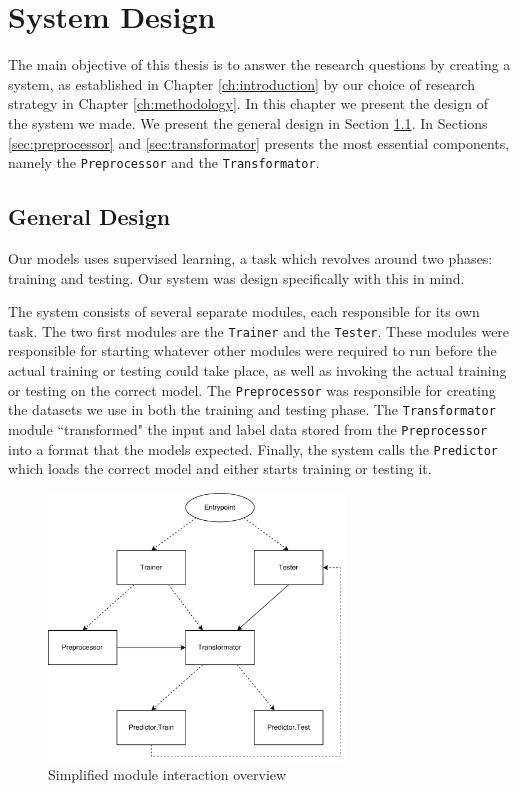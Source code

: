 
\chapter{System Design}
\label{ch:system_design}
The main objective of this thesis is to answer the research questions by creating a system, as established in Chapter \ref{ch:introduction} by our choice of research strategy in Chapter \ref{ch:methodology}. In this chapter we present the design of the system we made. We present the general design in Section \ref{sec:general_design}. In Sections \ref{sec:preprocessor} and \ref{sec:transformator} presents the most essential components, namely the {\tt Preprocessor} and the {\tt Transformator}.


\section{General Design}
\label{sec:general_design}
Our models uses supervised learning, a task which revolves around two phases: training and testing. Our system was design specifically with this in mind.

The system consists of several separate modules, each responsible for its own task. The two first modules are the {\tt Trainer} and the {\tt Tester}. These modules were responsible for starting whatever other modules were required to run before the actual training or testing could take place, as well as invoking the actual training or testing on the correct model. The {\tt Preprocessor} was responsible for creating the datasets we use in both the training and testing phase. The {\tt Transformator} module ``transformed" the input and label data stored from the {\tt Preprocessor} into a format that the models expected. Finally, the system calls the {\tt Predictor} which loads the correct model and either starts training or testing it.

\begin{figure}[ht]
    \centering
    \includegraphics[width=0.7\textwidth]{fig/system_design/system_design.png}
    \caption{Simplified module interaction overview}
    \label{fig:system-design}
\end{figure}

